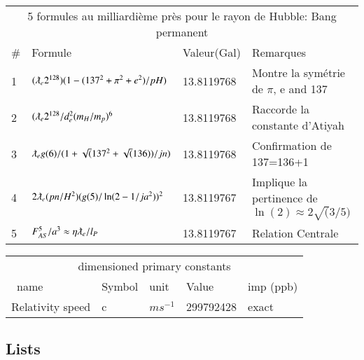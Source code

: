 \documentclass[a4paper,9pt]{article}
\begin{document}
\begin{table*}
  \hskip-2.0cm\begin{tabular}{llll}
    \toprule
    \multicolumn{4}{c}{5 formules au milliardi\`{e}me pr\`{e}s pour le rayon de Hubble: Bang permanent}                   \\
    \cmidrule(r){1-4}
   \#     & Formule     & Valeur(Gal) & Remarques \\
    \midrule
    1 & $(\lambdabar_{e} 2^{128})(1-(137^2+\pi^2+e^2)/pH)$ & 13.8119768  & Montre la sym\'{e}trie de $\pi$, e and 137 \\
    2 & $(\lambdabar_{e} 2^{128}/d_e^2(m_H/m_p)^6$ & 13.8119768  & Raccorde la constante d'Atiyah \\
    3 & $\lambdabar_e g(6)/(1+\sqrt(137^2+\sqrt(136))/jn)$ & 13.8119768 & Confirmation de 137=136+1 \\
    4 & $2\lambdabar_{e} (pn/H^{2})(g(5)/\ln(2-1/ja^2))^2$ & 13.8119767  & Implique la pertinence de $\ln(2) \approx 2\sqrt(3/5)$  \\    
    5 & $F_{AS}^5/a^3 \approx \eta \lambdabar_{e}/l_P$ & 13.8119767  & Relation Centrale  \\
    \bottomrule
  \end{tabular}
  \label{tab:table}
\end{table*}

\begin{table*}
  \hskip-2.0cm\begin{tabular}{lllll}
    \toprule
    \multicolumn{5}{c}{dimensioned primary constants}                   \\  
   \ name & Symbol   & unit   & Value & imp (ppb) \\
    \cmidrule(r){1-5}
    \midrule
    Relativity speed     & c   & $m s^{-1}$   & 299792428 & exact \\
    
    \bottomrule
  \end{tabular}
  \label{tab:table}
\end{table*}

\subsection{Lists}



  
\end{document}
